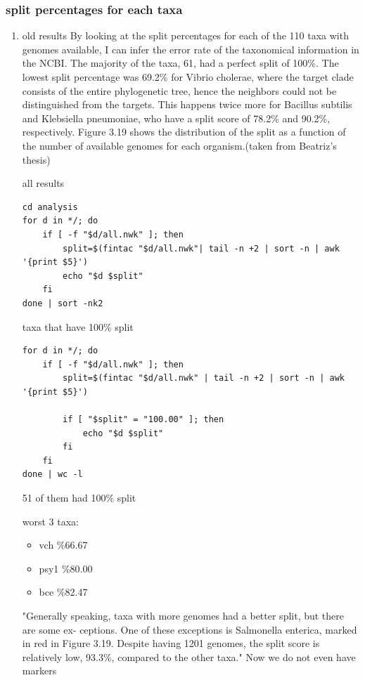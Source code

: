 \documentclass[11pt]{article}
\begin{document}
\subsubsection{split percentages for each taxa}
\label{sec:orge7f8619}
\begin{enumerate}
\item old results
\label{sec:org2675a97}
By looking at the split percentages for each of the 110 taxa with genomes available, I
can infer the error rate of the taxonomical information in the NCBI. The majority of
the taxa, 61, had a perfect split of 100\%. The lowest split percentage was 69.2\% for
Vibrio cholerae, where the target clade consists of the entire phylogenetic tree, hence
the neighbors could not be distinguished from the targets. This happens twice more for
Bacillus subtilis and Klebsiella pneumoniae, who have a split score of 78.2\% and 90.2\%,
respectively. Figure 3.19 shows the distribution of the split as a function of the number of
available genomes for each organism.(taken from Beatriz's thesis)

all results
\begin{verbatim}
cd analysis
for d in */; do
    if [ -f "$d/all.nwk" ]; then
        split=$(fintac "$d/all.nwk"| tail -n +2 | sort -n | awk '{print $5}')
        echo "$d $split"
    fi
done | sort -nk2
\end{verbatim}


taxa that have 100\% split
\begin{verbatim}
for d in */; do
    if [ -f "$d/all.nwk" ]; then
        split=$(fintac "$d/all.nwk" | tail -n +2 | sort -n | awk '{print $5}')

        if [ "$split" = "100.00" ]; then
            echo "$d $split"
        fi
    fi
done | wc -l
\end{verbatim}
51 of them had 100\% split

worst 3 taxa:
\begin{itemize}
\item vch \%66.67
\item psy1 \%80.00
\item bce \%82.47
\end{itemize}


"Generally speaking, taxa with more genomes had a better split, but there are some ex-
ceptions. One of these exceptions is Salmonella enterica, marked in red in Figure 3.19.
Despite having 1201 genomes, the split score is relatively low, 93.3\%, compared to the
other taxa." Now we do not even have markers
\end{enumerate}
\end{document}
